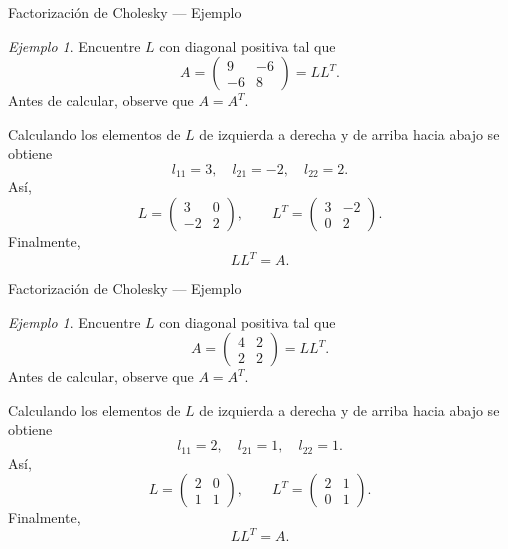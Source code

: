 \documentclass[aspectratio=169,11pt]{beamer}
\theoremstyle{remark}
\newtheorem{Ejem}[definicion]{Ejemplo}
\begin{document}
\begin{frame}[shrink=5]{Factorización de Cholesky — Ejemplo}
\footnotesize
\begin{Ejem}

Encuentre $L$ con diagonal positiva tal que
\[
A=\begin{pmatrix}9 & -6\\-6 & 8\end{pmatrix}=LL^T.
\]
Antes de calcular, observe que $A=A^T$.

Calculando los elementos de $L$ de izquierda a derecha y de arriba hacia abajo se obtiene
\[
l_{11}=3,\quad l_{21}=-2,\quad l_{22}=2.
\]
Así,
\[
L=\begin{pmatrix}3 & 0\\-2 & 2\end{pmatrix},\qquad L^T=\begin{pmatrix}3 & -2\\0 & 2\end{pmatrix}.
\]
Finalmente,
\[
\boxed{LL^T=A}.
\]

\end{Ejem}
\end{frame}

\begin{frame}[shrink=5]{Factorización de Cholesky — Ejemplo}
\footnotesize
\begin{Ejem}

Encuentre $L$ con diagonal positiva tal que
\[
A=\begin{pmatrix}4 & 2\\2 & 2\end{pmatrix}=LL^T.
\]
Antes de calcular, observe que $A=A^T$.

Calculando los elementos de $L$ de izquierda a derecha y de arriba hacia abajo se obtiene
\[
l_{11}=2,\quad l_{21}=1,\quad l_{22}=1.
\]
Así,
\[
L=\begin{pmatrix}2 & 0\\1 & 1\end{pmatrix},\qquad L^T=\begin{pmatrix}2 & 1\\0 & 1\end{pmatrix}.
\]
Finalmente,
\[
\boxed{LL^T=A}.
\]

\end{Ejem}
\end{frame}
\end{document}

